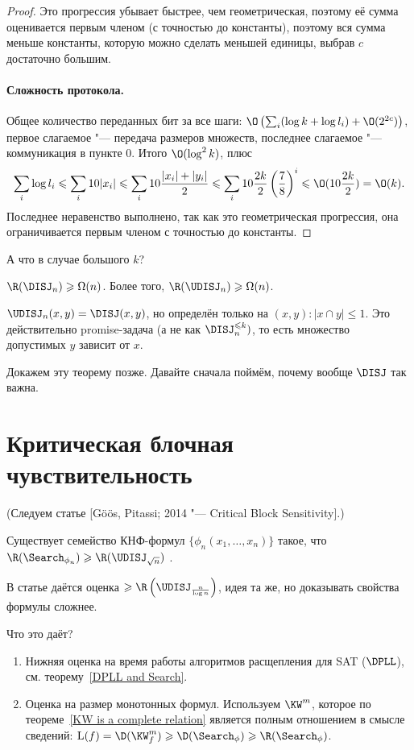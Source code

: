 \begin{proof}
Это прогрессия убывает быстрее, чем геометрическая, поэтому её сумма оценивается первым членом (с точностью до константы), поэтому вся сумма меньше константы, которую можно сделать меньшей единицы, выбрав $c$ достаточно большим.

\paragraph{Сложность протокола.}
Общее количество переданных бит за все шаги: $\O\left(\sum_i (\log k + \log l_i) + \O(2^{2c})\right)$, первое слагаемое "--- передача размеров множеств, последнее слагаемое "--- коммуникация в пункте 0. Итого $\O(\log^2 k)$, плюс
$$\sum_i \log l_i \leqslant
\sum_i 10|x_i| \leqslant
\sum_i 10\frac{|x_i|+|y_i|}{2} \leqslant
\sum_i 10\frac{2k}{2}\left(\frac{7}{8}\right)^i
\leqslant \O(10\frac{2k}{2}) =
\O(k).$$
Последнее неравенство выполнено, так как это геометрическая прогрессия, она ограничивается первым членом с точностью до константы.
\end{proof}

А что в случае большого $k$?
\begin{theorem}
$\R(\DISJ_n)\geqslant \Omega(n)$.
Более того, $\R(\UDISJ_n)\geqslant \Omega(n)$.
\end{theorem}

$\UDISJ_n(x, y) = \DISJ(x, y)$, но определён только на $(x, y)\colon |x\cap y| \leqslant 1$.
Это действительно promise-задача (а не как $\DISJ^{\leqslant k}_n)$, то есть множество допустимых $y$ зависит от $x$.

Докажем эту теорему позже. Давайте сначала поймём, почему вообще $\DISJ$ так важна.

\section{Критическая блочная чувствительность}
(Следуем статье [Göös, Pitassi; 2014 "--- Critical Block Sensitivity].)

\begin{theorem}
Существует семейство КНФ-формул $\{\phi_n(x_1, \ldots, x_n)\}$ такое, что $\R(\Search_{\phi_n})\geqslant \R(\UDISJ_{\sqrt{n}})$ .
\end{theorem}

В статье даётся оценка $\geqslant \R\left(\UDISJ_\frac{n}{\log n}\right)$, идея та же, но доказывать свойства формулы сложнее.

Что это даёт?
\begin{enumerate}
    \item Нижняя оценка на время работы алгоритмов расщепления для SAT ($\DPLL$), см. теорему~\ref{DPLL and Search}.
    \item Оценка на размер монотонных формул. Используем $\KW^m$, которое по теореме~\ref{KW is a complete relation} является полным отношением в смысле сведений: $\mathrm{L}(f) = \D(\KW^m_f) \geqslant \D(\Search_\phi) \geqslant \R(\Search_\phi)$.
\end{enumerate}

